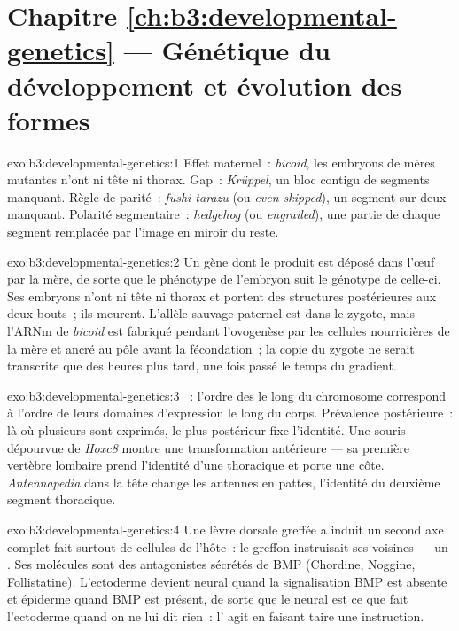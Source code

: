 \section*{Chapitre \ref{ch:b3:developmental-genetics} --- Génétique du développement et évolution des formes}

\begin{solution}{exo:b3:developmental-genetics:1}
Effet maternel~: \emph{bicoid}, les embryons de mères mutantes n'ont ni
tête ni thorax. Gap~: \emph{Krüppel}, un bloc contigu de segments
manquant. Règle de parité~: \emph{fushi tarazu} (ou \emph{even-skipped}),
un segment sur deux manquant. Polarité segmentaire~: \emph{hedgehog} (ou
\emph{engrailed}), une partie de chaque segment remplacée par l'image en
miroir du reste.
\end{solution}

\begin{solution}{exo:b3:developmental-genetics:2}
Un gène dont le produit est déposé dans l'œuf par la mère, de sorte que
le phénotype de l'embryon suit le génotype de celle-ci. Ses embryons
n'ont ni tête ni thorax et portent des structures postérieures aux deux
bouts~; ils meurent. L'allèle sauvage paternel est dans le zygote, mais
l'ARNm de \emph{bicoid} est fabriqué pendant l'ovogenèse par les
cellules nourricières de la mère et ancré au pôle avant la fécondation~;
la copie du zygote ne serait transcrite que des heures plus tard, une
fois passé le temps du gradient.
\end{solution}

\begin{solution}{exo:b3:developmental-genetics:3}
~: l'ordre des  le long du chromosome correspond à
l'ordre de leurs domaines d'expression le long du corps. Prévalence
postérieure~: là où plusieurs sont exprimés, le plus postérieur fixe
l'identité. Une souris dépourvue de \emph{Hoxc8} montre une
transformation antérieure --- sa première vertèbre lombaire prend
l'identité d'une thoracique et porte une côte. \emph{Antennapedia} dans
la tête change les antennes en pattes, l'identité du deuxième segment
thoracique.
\end{solution}

\begin{solution}{exo:b3:developmental-genetics:4}
Une lèvre dorsale greffée a induit un second axe complet fait surtout de
cellules de l'hôte~: le greffon instruisait ses voisines --- un
. Ses molécules sont des antagonistes sécrétés de BMP
(Chordine, Noggine, Follistatine). L'ectoderme devient neural quand la
signalisation BMP est absente et épiderme quand BMP est présent, de
sorte que le neural est ce que fait l'ectoderme quand on ne lui dit
rien~: l' agit en faisant taire une instruction.
\end{solution}


